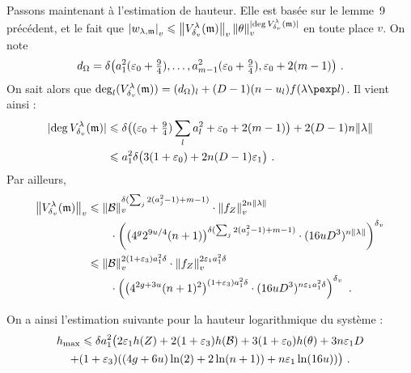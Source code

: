 Passons maintenant à l'estimation de hauteur. Elle est basée sur le lemme~9
précédent, et le fait que $\left\lvert w_{\lambda, {\mathfrak m}}\right\rvert_{v} \leqslant
\left\lVert V_{\delta\smash{_v}}^\lambda({\mathfrak m})\right\rVert_{v} \left\lVert\theta\right\rVert_{v}^{{\lvert\deg V_ {\delta\smash{_v}}^{\lambda}({\mathfrak m})\rvert}}$ en
toute place $v$. On note
\[
  d_\Omega = \delta \bigl(a_1^2 (\varepsilon_0 + \tfrac94), \ldots,
  a_{m-1}^2 (\varepsilon_0 + \tfrac94), \varepsilon_0 + 2(m-1) \bigl) \text{ .}
\]
On sait alors que $\deg_l(V_\dv^\lambda(\monome)) = (d_\Omega)_l +
(D-1) (n-u_l) f(\lambda\pexp l)$. Il vient ainsi :
\begin{align*}
  {\lvert\deg V_ {\delta\smash{_v}}^{\lambda}({\mathfrak m})\rvert}
  & \leqslant \delta \bigl( (\varepsilon_0 + \tfrac94) \sum_l a_l^2 + \varepsilon_0 + 2(m-1) \bigr)
    + 2(D-1) n\lVert\lambda\rVert \\
  & \leqslant a_1^2 \delta \bigl( 3(1+\varepsilon_0) + 2n (D-1) \varepsilon_1 \bigr) \text{ .}
\end{align*}
Par ailleurs,
\begin{align*}
  \left\lVert V_{\delta\smash{_v}}^\lambda({\mathfrak m})\right\rVert_{v}
  & \leqslant \left\lVert\mathcal B\right\rVert_{v} ^{\delta(\sum_j 2(a_j^2 -1) + m-1)} \cdot \left\lVert f_Z\right\rVert_{v}^{2n\lVert\lambda\rVert}
    \\ & \qquad \cdot \left(
    \bigl( 4^g 2^{9u/4} (n+1) \bigr)^{\delta(\sum_j 2(a_j^2-1) + m-1)}
    \cdot (16uD^3)^{n\lVert\lambda\rVert}
    \right)^{\delta\smash{_v}} \\
  & \leqslant \left\lVert\mathcal B\right\rVert_{v} ^{2(1+\varepsilon_3) a_1^2\delta} \cdot \left\lVert f_Z\right\rVert_{v}^{2\varepsilon_1 a_1^2\delta}
    \\ & \qquad \cdot \left(
    \bigl( 4^{2g+3u} (n+1)^2 \bigr)^{(1+\varepsilon_3) a_1^2\delta}
    \cdot (16uD^3)^{n\varepsilon_1 a_1^2\delta}
    \right)^{\delta\smash{_v}} \text{ .}
\end{align*}

On a ainsi l'estimation suivante  pour la hauteur logarithmique du système :
\begin{multline*}
  h_{\mathrm{max}} \leqslant \delta a_1^2 \bigl( 2\varepsilon_1 h(Z) + 2(1+\varepsilon_3) h(\mathcal B)
  + 3(1+\varepsilon_0) h(\theta)  + 3n\varepsilon_1D  \\ + (1+\varepsilon_3)((4g+6u)\ln(2)
  + 2\ln(n+1)) + n\varepsilon_1\ln(16u)) \bigr) \text{ .}
\end{multline*}


